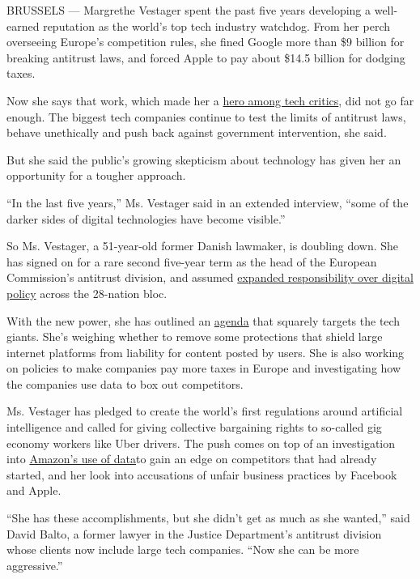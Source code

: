 BRUSSELS --- Margrethe Vestager spent the past five years developing a
well-earned reputation as the world's top tech industry watchdog. From
her perch overseeing Europe's competition rules, she fined Google more
than \$9 billion for breaking antitrust laws, and forced Apple to pay
about \$14.5 billion for dodging taxes.

Now she says that work, which made her a
\href{https://www.nytimes.com/2018/05/05/world/europe/margrethe-vestager-silicon-valley-data-privacy.html}{hero
among tech critics}, did not go far enough. The biggest tech companies
continue to test the limits of antitrust laws, behave unethically and
push back against government intervention, she said.

But she said the public's growing skepticism about technology has given
her an opportunity for a tougher approach.

``In the last five years,'' Ms. Vestager said in an extended interview,
``some of the darker sides of digital technologies have become
visible.''

So Ms. Vestager, a 51-year-old former Danish lawmaker, is doubling down.
She has signed on for a rare second five-year term as the head of the
European Commission's antitrust division, and assumed
\href{https://www.nytimes.com/2019/09/10/world/europe/margrethe-vestager-european-union-tech-regulation.html}{expanded
responsibility over digital policy} across the 28-nation bloc.

With the new power, she has outlined an
\href{http://www.europarl.europa.eu/RegData/etudes/BRIE/2019/640171/EPRS_BRI(2019)640171_EN.pdf}{agenda}
that squarely targets the tech giants. She's weighing whether to remove
some protections that shield large internet platforms from liability for
content posted by users. She is also working on policies to make
companies pay more taxes in Europe and investigating how the companies
use data to box out competitors.

Ms. Vestager has pledged to create the world's first regulations around
artificial intelligence and called for giving collective bargaining
rights to so-called gig economy workers like Uber drivers. The push
comes on top of an investigation into
\href{https://www.nytimes.com/2019/07/17/technology/amazon-eu.html}{Amazon's
use of data}to gain an edge on competitors that had already started, and
her look into accusations of unfair business practices by Facebook and
Apple.

``She has these accomplishments, but she didn't get as much as she
wanted,'' said David Balto, a former lawyer in the Justice Department's
antitrust division whose clients now include large tech companies. ``Now
she can be more aggressive.''

